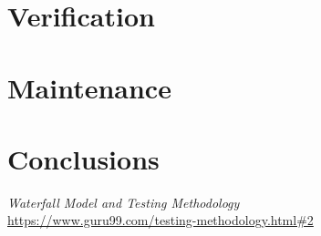 \documentclass[12pt]{article}
\begin{document}
\begin{myspace}{1.7}
%
%
\pagebreak
\section*{Verification}






%
%
\pagebreak
\section*{Maintenance}  





%
%
\pagebreak
\section*{Conclusions}  





%
%
\pagebreak
\begin{thebibliography}{9}
   \textit{Waterfall Model and Testing Methodology}\\
   \url{https://www.guru99.com/testing-methodology.html#2}

\end{thebibliography}
  
\end{myspace}
\end{document}
